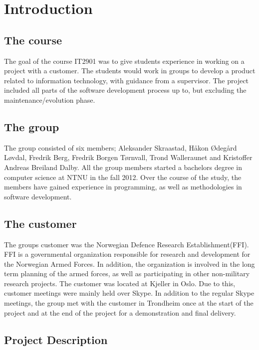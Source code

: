 
\chapter{Introduction}

\section{The course}

The goal of the course IT2901 was to give students experience in working on a project with a customer. The students would work in groups to develop a product related to information technology, with guidance from a supervisor. The project included all parts of the software development process up to, but excluding the maintenance/evolution phase.

\section{The group}

The group consisted of six members; Aleksander Skraastad, Håkon Ødegård Løvdal, Fredrik Berg, Fredrik Borgen Tørnvall, Trond Walleraunet and Kristoffer Andreas Breiland Dalby. All the group members started a bachelors degree in computer science at NTNU in the fall 2012. Over the course of the study, the members have gained experience in programming, as well as methodologies in software development.

\section{The customer}

The groups customer was the Norwegian Defence Research Establishment(FFI). FFI is a governmental organization responsible for research and development for the Norwegian Armed Forces. In addition, the organization is involved in the long term planning of the armed forces, as well as participating in other non-military research projects. The customer was located at Kjeller in Oslo. Due to this, customer meetings were mainly held over Skype. In addition to the regular Skype meetings, the group met with the customer in Trondheim once at the start of the project and at the end of the project for a demonstration and final delivery.

\section{Project Description}

